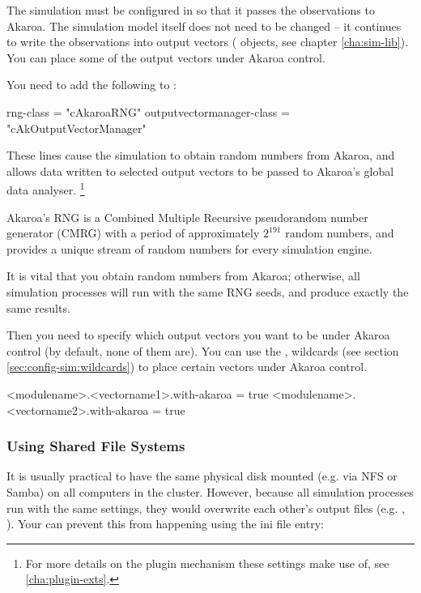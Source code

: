 The {\opp} simulation must be configured in 
so that it passes the observations to Akaroa. The simulation model itself does
not need to be changed -- it continues to write
the observations into output vectors ( objects,
see chapter \ref{cha:sim-lib}). You can place some of
the output vectors under Akaroa control.

You need to add the following to :

\begin{inifile}
[General]
rng-class = "cAkaroaRNG"
outputvectormanager-class = "cAkOutputVectorManager"
\end{inifile}

These lines cause the simulation to obtain random numbers from Akaroa,
and allows data written to selected output vectors to be passed to Akaroa's
global data analyser.
    \footnote{For more details on the plugin mechanism these settings make use of,
    see \ref{cha:plugin-exts}.}

Akaroa's RNG is a Combined Multiple Recursive pseudorandom
number generator (CMRG) with a period of approximately $2^{191}$
random numbers, and provides a unique stream of random numbers
for every simulation engine.

\begin{note}
It is vital that you obtain random numbers from Akaroa; otherwise,
all simulation processes will run with the same RNG seeds, and
produce exactly the same results.
\end{note}

Then you need to specify which output vectors you want to
be under Akaroa control (by default, none of them are).
You can use the \ttt{*}, \ttt{**} wildcards (see
section \ref{sec:config-sim:wildcards}) to
place certain vectors under Akaroa control.

\begin{inifile}
<modulename>.<vectorname1>.with-akaroa = true
<modulename>.<vectorname2>.with-akaroa = true
\end{inifile}


\subsubsection{Using Shared File Systems}
\label{sec:run-sim:akaroa-using-shared-filesystems}

It is usually practical to have the same physical disk mounted (e.g. via NFS or Samba)
on all computers in the cluster. However, because all {\opp} simulation
processes run with the same settings, they would overwrite each other's
output files (e.g. , ).
Your can prevent this from happening using the
 ini file entry:


